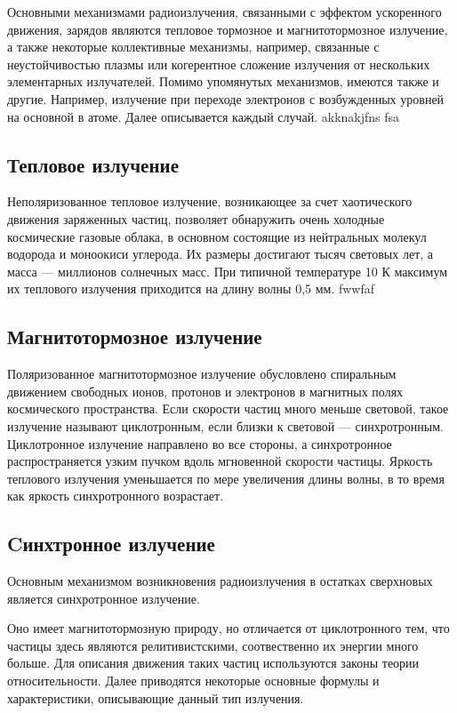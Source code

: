 \documentclass[a4paper,12pt]{extarticle}
\begin{document}
Основными механизмами радиоизлучения, связанными с эффектом ускоренного движения, зарядов являются тепловое тормозное и магнитотормозное излучение, а также некоторые коллективные механизмы, например, связанные с неустойчивостью плазмы или когерентное сложение излучения от нескольких элементарных излучателей. 
Помимо упомянутых механизмов, имеются также и другие. Например, излучение при переходе электронов с возбужденных уровней на основной в атоме. 
Далее описывается каждый случай.
akknakjfns fsa
\subsection{Тепловое излучение}  
Неполяризованное тепловое излучение, возникающее за счет хаотического движения заряженных частиц, позволяет обнаружить очень холодные космические газовые облака, в основном состоящие из нейтральных молекул водорода и моноокиси углерода. Их размеры достигают тысяч световых лет, а масса — миллионов солнечных масс. При типичной температуре 10 К максимум их теплового излучения приходится на длину волны 0,5 мм. fwwfaf

\subsection{Магнитотормозное излучение}
Поляризованное магнитотормозное излучение обусловлено спиральным движением свободных ионов, протонов и электронов в магнитных полях космического пространства. Если скорости частиц много меньше световой, такое излучение называют циклотронным, если близки к световой — синхротронным. Циклотронное излучение направлено во все стороны, а синхротронное распространяется узким пучком вдоль мгновенной скорости частицы. Яркость теплового излучения уменьшается по мере увеличения длины волны, в то время как яркость синхротронного возрастает.

\subsection{Cинхтронное излучение}
\indent Основным механизмом возникновения радиоизлучения в остатках сверхновых является синхротронное излучение.

Оно имеет магнитотормозную природу, но отличается от циклотронного тем, что частицы здесь являются релитивистскими, соотвественно их энергии много больше. 
Для описания движения таких частиц используются законы теории относительности. Далее приводятся некоторые основные формулы и характеристики, описывающие данный тип излучения. 
\end{document}
